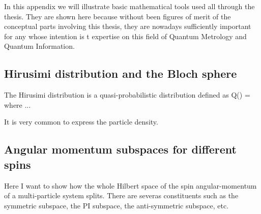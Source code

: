 In this appendix we will illustrate basic mathematical tools used all through the thesis.
They are shown here because without been figures of merit of the conceptual parts involving this thesis, they are nowadays sufficiently important for any whose intention is t expertise on this field of Quantum Metrology and Quantum Information.

\subsection{Hirusimi distribution and the Bloch sphere}

The Hirusimi distribution is a quasi-probabilistic distribution defined as
\be
  Q(\alpha) = \braOket{\alpha}{\varrho}{\alpha}
\ee
where ...

It is very common to express the particle density.

\subsection{Angular momentum subspaces for different spins}

Here I want to show how the whole Hilbert space of the spin angular-momentum of a multi-particle system splits. There are severas constituents such as the symmetric subspace, the PI subspace, the anti-symmetric subspace, etc.
